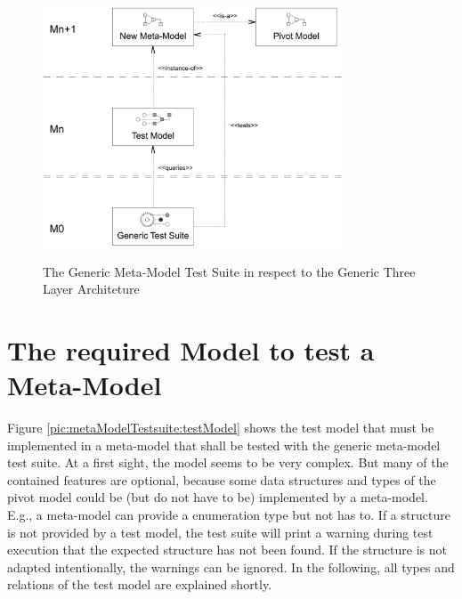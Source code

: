 \begin{figure}[!t]
	\centering
		\includegraphics[width=0.80\textwidth]{figures/metamodeltestsuite/genericTestSuite.pdf}
	\label{pic:metaModelTestsuite:genericTestSuite}
	\caption{The Generic Meta-Model Test Suite in respect to the Generic Three Layer Architeture}
\end{figure}



\section{The required Model to test a Meta-Model}

Figure \ref{pic:metaModelTestsuite:testModel} shows the test model that must be implemented in a meta-model that shall be tested with the generic meta-model test suite. At a first sight, the model seems to be very complex. But many of the contained features are optional, because some data structures and types of the pivot model could be (but do not have to be) implemented by a meta-model. E.g., a meta-model can provide a enumeration type but not has to. If a structure is not provided by a test model, the test suite will print a warning during test execution that the expected structure has not been found. If the structure is not adapted intentionally, the warnings can be ignored. In the following, all types and relations of the test model are explained shortly.

